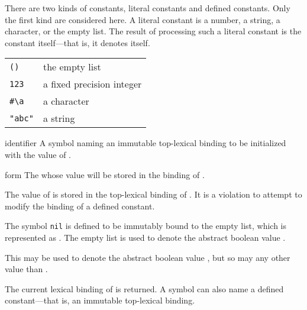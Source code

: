 \begin{optDefinition}
\noindent
%
\noindent
There are two kinds of constants, literal
constants and defined constants.  Only the
first kind are considered here.  A literal constant is a number, a string, a
character, or the empty list.  The result of processing such a literal constant
is the constant itself---that is, it denotes
itself.
%
\examples
\begin{tabular}{ll}
    \verb+()+ & the empty list\\
    \verb+123+ & a fixed precision integer\\
    \verb+#\a+ & a character\\
    \verb+"abc"+ & a string
\end{tabular}

%
\Syntax
{}%
%
\begin{arguments}
    \item[identifier] A symbol naming an immutable top-lexical binding to be
    initialized with the value of .

    \item[form] The  whose value will be stored in the binding of
    .
\end{arguments}
%
\remarks%
The value of  is stored in the top-lexical binding of
.  It is a violation to attempt to modify the binding of a
defined constant.

%
\remarks%
The symbol {\tt nil} is defined to be immutably bound to the empty list, which
is represented as \nil{}.  The empty list is used to denote the abstract boolean
value .

%
\remarks%
This may be used to denote the abstract boolean value , but so may any
other value than \nil{}.

\noindent
The current lexical binding of  is
returned.  A symbol can also name a defined
constant---that is, an immutable top-lexical binding.


\end{optDefinition}
